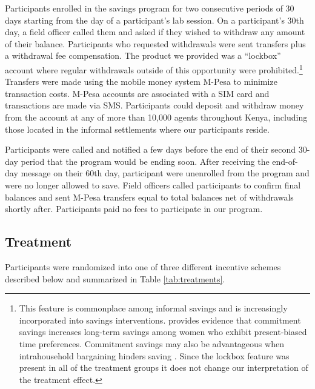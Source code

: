 \documentclass[12pt]{article}
\begin{document}
		Participants enrolled in the savings program for two consecutive periods of 30 days starting from the day of a participant's lab session. On a participant's 30th day, a field officer called them and asked if they wished to withdraw any amount of their balance. Participants who requested withdrawals were sent transfers plus a withdrawal fee compensation. The product we provided was a ``lockbox'' account where regular withdrawals outside of this opportunity were prohibited.\footnote{This feature is commonplace among informal savings and is increasingly incorporated into savings interventions. \textcite{ashraf_tying_2006} provides evidence that commitment savings increases long-term savings among women who exhibit present-biased time preferences. Commitment savings may also be advantageous when intrahousehold bargaining hinders saving \parencite{banerjee_economic_2007,schaner_cost_2011}. Since the lockbox feature was present in all of the treatment groups it does not change our interpretation of the treatment effect.} Transfers were made using the mobile money system M-Pesa to minimize transaction costs. M-Pesa accounts are associated with a SIM card and transactions are made via SMS. Participants could deposit and withdraw money from the account at any of more than 10,000 agents throughout Kenya, including those located in the informal settlements where our participants reside.

		Participants were called and notified a few days before the end of their second 30-day period that the program would be ending soon. After receiving the end-of-day message on their 60th day, participant were unenrolled from the program and were no longer allowed to save. Field officers called participants to confirm final balances and sent M-Pesa transfers equal to total balances net of withdrawals shortly after. Participants paid no fees to participate in our program.

	\subsection{Treatment} \label{sec:treat}

		Participants were randomized into one of three different incentive schemes described below and summarized in Table \ref{tab:treatments}.
\end{document}
